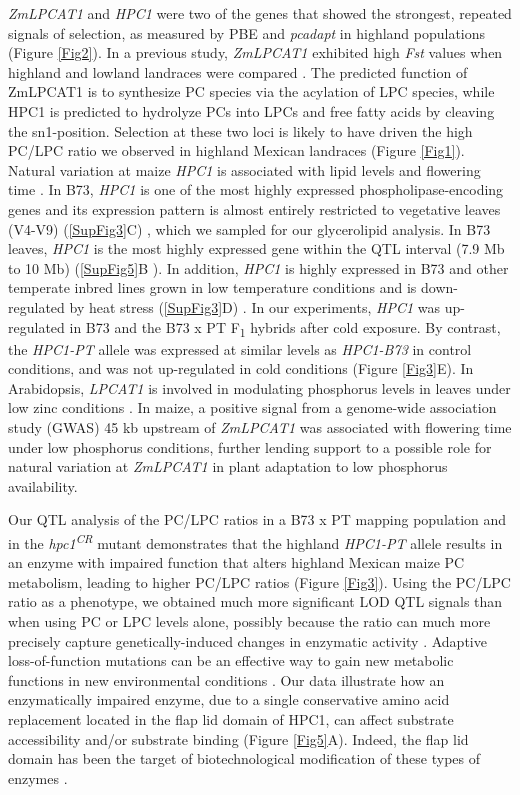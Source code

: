 \documentclass[9pt,twocolumn,twoside,lineno]{BioRxiv}
\begin{document}
\textit{ZmLPCAT1} and \textit{HPC1} were two of the genes that showed the strongest, repeated signals of selection, as measured by PBE and \textit{pcadapt} in highland populations (Figure \ref{Fig2}). 
In a previous study, \textit{ZmLPCAT1} exhibited high \textit{Fst} values when highland and lowland landraces were compared \cite{Takuno2015-uj}.
The predicted function of ZmLPCAT1 is to synthesize PC species via the acylation of LPC species, while HPC1 is predicted to hydrolyze PCs into LPCs and free fatty acids by cleaving the sn1-position.
Selection at these two loci is likely to have driven the high PC/LPC ratio we observed in highland Mexican landraces (Figure \ref{Fig1}).
Natural variation at maize \textit{HPC1} is associated with lipid levels \cite{Riedelsheimer2012-bx} and flowering time \cite{Chen2012-gg, Hung2012-ms}. 
In B73, \textit{HPC1} is one of the most highly expressed phospholipase-encoding genes and its expression pattern is almost entirely restricted to vegetative leaves (V4-V9) (\ref{SupFig3}C) \cite{Stelpflug2016-vr}, which we sampled for our glycerolipid analysis. 
In B73 leaves, \textit{HPC1} is the most highly expressed gene within  the QTL interval (7.9 Mb to 10 Mb) (\ref{SupFig5}B \cite{Stelpflug2016-vr}).
In addition, \textit{HPC1} is highly expressed in B73 and other temperate inbred lines grown in low temperature conditions and is down-regulated by heat stress (\ref{SupFig3}D) \cite{Waters2017-nat}.
In our experiments, \textit{HPC1} was up-regulated in B73 and the B73 x PT F\textsubscript{1} hybrids after cold exposure. 
By contrast, the \textit{HPC1-PT} allele was expressed at similar levels as \textit{HPC1-B73} in control conditions, and was not up-regulated in cold conditions (Figure \ref{Fig3}E).
In Arabidopsis, \textit{LPCAT1} is involved in modulating phosphorus levels in leaves under low zinc conditions \cite{Kisko2018-zm}.
In maize, a positive signal from a genome-wide association study (GWAS) 45 kb upstream of \textit{ZmLPCAT1} was associated with flowering time under low phosphorus conditions, further lending support to a possible role for natural variation at \textit{ZmLPCAT1} in plant adaptation to low phosphorus availability. 

Our QTL analysis of the PC/LPC ratios in a B73 x PT mapping population and in the \textit{hpc1\textsuperscript{CR}} mutant demonstrates that the highland \textit{HPC1-PT} allele results in an enzyme with impaired function that alters highland Mexican maize PC metabolism, leading to higher PC/LPC ratios (Figure \ref{Fig3}). 
Using the PC/LPC ratio as a phenotype, we obtained much more significant LOD QTL signals than when using PC or LPC levels alone, possibly because the ratio can much more precisely capture genetically-induced changes in enzymatic activity \cite{Petersen2012-ii}.
Adaptive loss-of-function mutations can be an effective way to gain new metabolic functions in new environmental conditions \cite{Hottes2013-np}. 
Our data illustrate how an enzymatically impaired enzyme, due to a single conservative amino acid replacement located in the flap lid domain of HPC1,  can affect substrate  accessibility and/or substrate binding (Figure \ref{Fig5}A). 
Indeed, the flap lid domain has been the target of biotechnological modification of these types of enzymes \cite{Khan2017-ua}.
\end{document}
